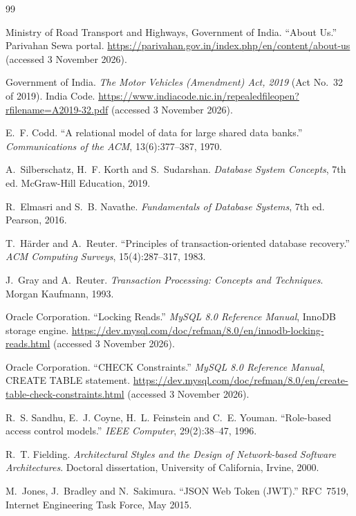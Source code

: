 \clearpage
{}
\begin{thebibliography}{99}
\setlength{\itemsep}{4pt}

 Ministry of Road Transport and Highways, Government of India. ``About Us.'' Parivahan Sewa portal. \url{https://parivahan.gov.in/index.php/en/content/about-us} (accessed 3 November 2026).

 Government of India. \emph{The Motor Vehicles (Amendment) Act, 2019} (Act No.~32 of 2019). India Code. \url{https://www.indiacode.nic.in/repealedfileopen?rfilename=A2019-32.pdf} (accessed 3 November 2026).

 E.~F. Codd. ``A relational model of data for large shared data banks.'' \emph{Communications of the ACM}, 13(6):377--387, 1970.

 A.~Silberschatz, H.~F. Korth and S.~Sudarshan. \emph{Database System Concepts}, 7th ed. McGraw-Hill Education, 2019.

 R.~Elmasri and S.~B. Navathe. \emph{Fundamentals of Database Systems}, 7th ed. Pearson, 2016.

 T.~H\"arder and A.~Reuter. ``Principles of transaction-oriented database recovery.'' \emph{ACM Computing Surveys}, 15(4):287--317, 1983.

 J.~Gray and A.~Reuter. \emph{Transaction Processing: Concepts and Techniques}. Morgan Kaufmann, 1993.

 Oracle Corporation. ``Locking Reads.'' \emph{MySQL 8.0 Reference Manual}, InnoDB storage engine. \url{https://dev.mysql.com/doc/refman/8.0/en/innodb-locking-reads.html} (accessed 3 November 2026).

 Oracle Corporation. ``CHECK Constraints.'' \emph{MySQL 8.0 Reference Manual}, CREATE TABLE statement. \url{https://dev.mysql.com/doc/refman/8.0/en/create-table-check-constraints.html} (accessed 3 November 2026).

 R.~S. Sandhu, E.~J. Coyne, H.~L. Feinstein and C.~E. Youman. ``Role-based access control models.'' \emph{IEEE Computer}, 29(2):38--47, 1996.

 R.~T. Fielding. \emph{Architectural Styles and the Design of Network-based Software Architectures}. Doctoral dissertation, University of California, Irvine, 2000.

 M.~Jones, J.~Bradley and N.~Sakimura. ``JSON Web Token (JWT).'' RFC~7519, Internet Engineering Task Force, May 2015.


\end{thebibliography}
